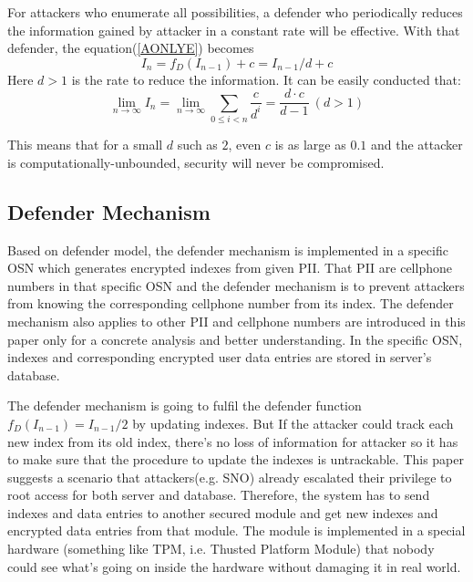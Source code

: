 \documentclass[10pt, conference, compsocconf]{IEEEtran}
\begin{document}
        For attackers who enumerate all possibilities,
        a defender
        who periodically reduces the information gained by
        attacker in a constant rate will be effective. With
        that defender,
        the equation(\ref{AONLYE}) becomes
        \begin{equation}
            I_n = f_D(I_{n-1})+c = I_{n-1}/d+c
        \end{equation}
        Here $d > 1$ is the rate to reduce the information.
        It can be easily conducted that:
        \begin{equation*}
            \lim_{n \rightarrow \infty} I_n = \lim_{n \rightarrow \infty} \sum_{0 \leq i < n} \frac{c}{d^i}
                = \frac{d \cdot c}{d-1} ~(d > 1)
        \end{equation*}

        This means that for a small $d$ such as $2$, even $c$ is as large as
        $0.1$ and the attacker is computationally-unbounded, security will
        never be compromised.

    \subsection{Defender Mechanism}\label{sec_ds}
        Based on defender model, the defender mechanism is implemented
        in a specific OSN
        which generates encrypted indexes
        from given PII. That PII are cellphone numbers
        in that specific OSN and the defender mechanism is to prevent attackers
        from knowing the corresponding cellphone number from its index.
        The defender mechanism also applies to other PII and cellphone numbers are introduced
        in this paper only for a concrete analysis and better understanding.
        In the specific OSN, indexes and corresponding encrypted user data entries are stored
        in server's database.

        The defender mechanism is going to fulfil the defender
        function $f_D(I_{n-1}) = I_{n-1}/2$ by updating indexes.
        But If the attacker
        could track each new index from its old index, there's no loss of information
        for attacker so it has to make sure that the procedure to update the indexes
        is untrackable.
        This paper suggests a scenario that attackers(e.g. SNO) already
        escalated their privilege to root access for
        both server and database. Therefore, the system has to send
        indexes and data entries to another
        secured module and get new indexes and encrypted data
        entries from that module.
        The module is implemented in a special hardware (something
        like TPM, i.e. Thusted Platform Module) that nobody
        could see what's going on inside the hardware without damaging it in real world.
\end{document}
